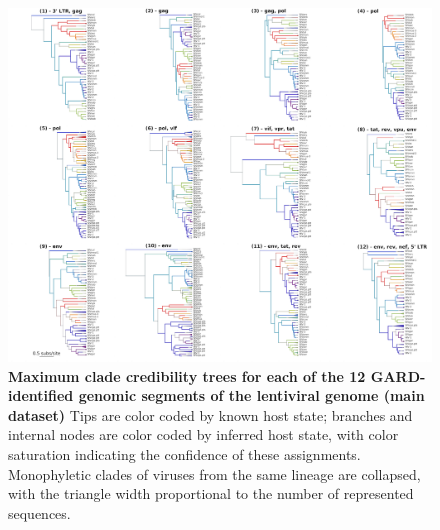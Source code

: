 \begin{figure}[h!]
  \begin{centering}
    \includegraphics[width=\linewidth]{./png/siv_maindata_trees.png}
  	\caption[Phylogenies of each segment of the lentiviral genome (main dataset)]{\textbf{Maximum clade credibility trees for each of the 12 GARD-identified genomic segments of the lentiviral genome (main dataset) }
Tips are color coded by known host state; branches and internal nodes are color coded by inferred host state, with color saturation indicating the confidence of these assignments.
Monophyletic clades of viruses from the same lineage are collapsed, with the triangle width proportional to the number of represented sequences.
        }
  	\label{siv_maindata_trees.png}
  \end{centering}
\end{figure}

